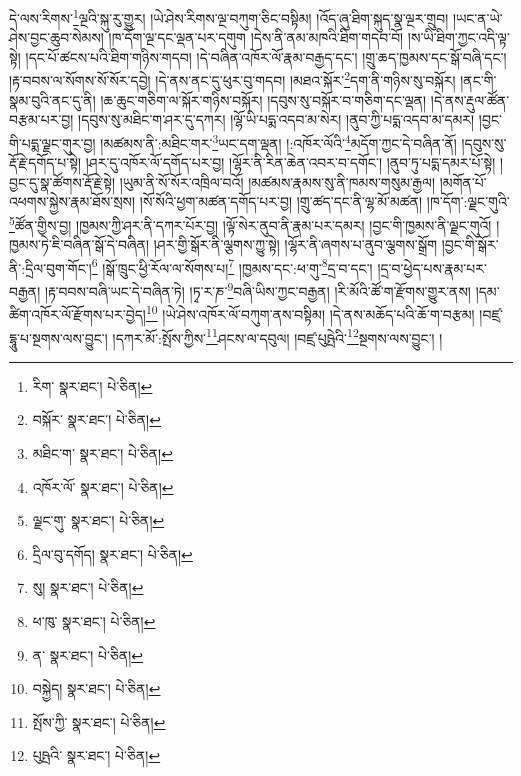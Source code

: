 དེ་ལས་རིགས་\footnote{རིག་  སྣར་ཐང་།  པེ་ཅིན། }ལྔའི་སྐུ་རུ་གྱུར། །ཡེ་ཤེས་རིགས་ལྔ་བཀུག་ཅིང་བསྟིམ། །འོད་ཞུ་ཐིག་སྐུད་སྣ་ལྔར་གྲུབ། །ཡང་ན་ཡེ་ཤེས་བྱང་ཆུབ་སེམས། །ཁ་དོག་ལྔ་དང་ལྡན་པར་དགུག །དེས་ནི་ནམ་མཁའི་ཐིག་གདབ་བོ། །ས་ཡི་ཐིག་ཀྱང་འདི་ལྟ་སྟེ། །དང་པོ་ཚངས་པའི་ཐིག་གཉིས་གདབ། །དེ་བཞིན་འཁོར་ལོ་རྣམ་བརྒྱད་དང་། །གྲུ་ཆད་ཁྱམས་དང་སྒོ་བཞི་དང་། །རྟ་བབས་ལ་སོགས་སོ་སོར་དབྱེ། །དེ་ནས་ནང་དུ་ཕུར་བུ་གདབ། །མཐའ་སྐོར་\footnote{བསྐོར་  སྣར་ཐང་།  པེ་ཅིན། }དག་ནི་གཉིས་སུ་བསྐོར། །ནང་གི་སྣམ་བུའི་ནང་དུ་ནི། །ཆ་ཆུང་གཅིག་ལ་སྐོར་གཉིས་བསྐོར། །དབུས་སུ་བསྐོར་བ་གཅིག་དང་ལྡན། །དེ་ནས་རྡུལ་ཚོན་བརྩམ་པར་བྱ། །དབུས་སུ་མཐིང་ག་ཤར་དུ་དཀར། །ལྷོ་ཡི་པདྨ་འདབ་མ་སེར། །ནུབ་ཀྱི་པདྨ་འདབ་མ་དམར། །བྱང་གི་པདྨ་ལྗང་གུར་བྱ། །མཚམས་ནི་:མཐིང་གར་\footnote{མཐིང་ག་  སྣར་ཐང་།  པེ་ཅིན། }ཡང་དག་ལྡན། །:འཁོར་ལོའི་\footnote{འཁོར་ལོ་  སྣར་ཐང་།  པེ་ཅིན། }མདོག་ཀྱང་དེ་བཞིན་ནོ། །དབུས་སུ་རྡོ་རྗེ་དགོད་པ་སྟེ། །ཤར་དུ་འཁོར་ལོ་དགོད་པར་བྱ། །ལྷོར་ནི་རིན་ཆེན་འབར་བ་དགོང་། །ནུབ་ཏུ་པདྨ་དམར་པོ་སྟེ། །བྱང་དུ་སྣ་ཚོགས་རྡོ་རྗེ་སྟེ། །ཡུམ་ནི་སོ་སོར་འཁྲིལ་བའོ། །མཚམས་རྣམས་སུ་ནི་ཁམས་གསུམ་རྒྱལ། །མགོན་པོ་འཕགས་སྐྱེས་རྣམ་ཐོས་སྲས། །སོ་སོའི་ཕྱག་མཚན་དགོད་པར་བྱ། །གྲུ་ཚད་དང་ནི་ལྷ་མོ་མཚན། །ཁ་དོག་:ལྗང་གུའི་\footnote{ལྗང་གུ་  སྣར་ཐང་།  པེ་ཅིན། }ཚོན་གྱིས་བྱ། །ཁྱམས་ཀྱི་ཤར་ནི་དཀར་པོར་བྱ། །ལྟོ་སེར་ནུབ་ནི་རྣམ་པར་དམར། །བྱང་གི་ཁྱམས་ནི་ལྗང་གུའོ། །ཁྱམས་ཏེ་ཇི་བཞིན་སྒོ་དེ་བཞིན། །ཤར་གྱི་སྒོར་ནི་ལྕགས་ཀྱུ་སྟེ། །ལྷོར་ནི་ཞགས་པ་ནུབ་ལྕགས་སྒྲོག །བྱང་གི་སྒོར་ནི་:དྲིལ་བུག་གོང་།\footnote{དྲིལ་བུ་དགོད།  སྣར་ཐང་།  པེ་ཅིན། } །སྒོ་ཁྲུང་ཕྱི་རོལ་ལ་སོགས་པ།\footnote{སུ།  སྣར་ཐང་།  པེ་ཅིན། } །ཁྱམས་དང་:ཕ་གུ་\footnote{ཕ་ཁུ་  སྣར་ཐང་།  པེ་ཅིན། }དྲ་བ་དང་། །དྲ་བ་ཕྱེད་པས་རྣམ་པར་བརྒྱན། །རྟ་བབས་བཞི་ཡང་དེ་བཞིན་ཏེ། །ཏྭ་ར་ཎ་\footnote{ན་  སྣར་ཐང་།  པེ་ཅིན། }བཞི་ཡིས་ཀྱང་བརྒྱན། །རི་མོའི་ཚོ་ག་རྫོགས་གྱུར་ནས། །དམ་ཚིག་འཁོར་ལོ་རྫོགས་པར་བྱེད།\footnote{བསྐྱེད།  སྣར་ཐང་།  པེ་ཅིན། } །ཡེ་ཤེས་འཁོར་ལོ་བཀུག་ནས་བསྟིམ། །དེ་ནས་མཆོད་པའི་ཆོ་ག་བརྩམ། །བཛྲ་དྷཱུ་པ་སྔགས་ལས་བྱུང་། །དཀར་མོ་:སྤོས་ཀྱིས་\footnote{སྤོས་ཀྱི་  སྣར་ཐང་།  པེ་ཅིན། }ཤངས་ལ་དབུལ། །བཛྲ་པུཥྤེའི་\footnote{པུཥྤའི་  སྣར་ཐང་།  པེ་ཅིན། }སྔགས་ལས་བྱུང་། །
